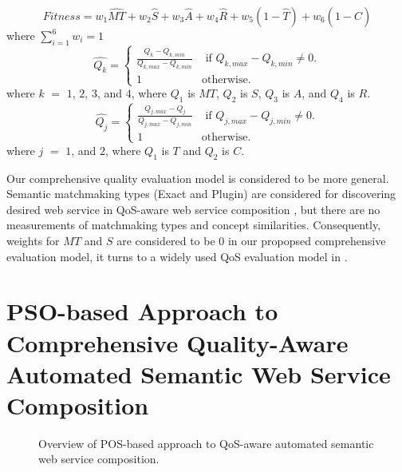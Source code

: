 \documentclass{llncs}
\begin{document}
\vspace{-0.2cm}
\begin{equation}
\label{equation8}
Fitness = w_1 \hat{MT} + w_2 \hat{S} + w_3 \hat{A} + w_4 \hat{R} + w_5(1 - \hat{T}) + w_6(1 - \hat{C})
\end{equation}
\noindent where $\sum_{i=1}^{6} w_i = 1$
\\
\vspace{-0.2cm}
\begin{equation}
\label{equation9}
\hat{Q_k} = 
\begin{cases}
	\frac{Q_k - Q_{k, min}}{Q_{k, max} - Q_{k, min}} & \text{ if }Q_{k, max} - Q_{k, min} \neq 0.\\
	1 & \mathrm{ otherwise}.
\end{cases}
\end{equation}
\noindent where $k$ $=$ $1$, $2$, $3$, and $4$, where $Q_1$ is $MT$, $Q_2$ is $S$, $Q_3$ is $A$, and $Q_4$ is $R$.
\begin{equation}
\label{equation10}
\hat{Q_j} = 
\begin{cases}
	\frac{Q_{j,max} - Q_j}{Q_{j, max} - Q_{j, min}} & \text{ if }Q_{j, max} - Q_{j, min} \neq 0.\\
	1 & \mathrm{ otherwise}.
\end{cases}
\end{equation}
\noindent where $j$ $=$ $1$, and $2$, where $Q_1$ is $T$ and $Q_2$ is $C$.


Our comprehensive quality evaluation model is considered to be more general. Semantic matchmaking types (Exact and Plugin) are considered for discovering desired web service in QoS-aware web service composition  \cite{ma2015hybrid,da2016particle,da2015graphevol}, but there are no measurements of matchmaking types and concept similarities. Consequently, weights for $MT$ and $S$ are considered to be 0 in our propopsed comprehensive evaluation model, it turns to a widely used QoS evaluation model in \cite{ma2015hybrid,da2016particle,da2015graphevol}.
\section{PSO-based Approach to Comprehensive Quality-Aware Automated Semantic Web Service Composition}\label{qswsc_approach}

\begin{figure}[h]
\centering
{}
 \caption{Overview of POS-based approach to QoS-aware automated semantic web service composition.}
 \label{overview}
\end{figure}
\end{document}
